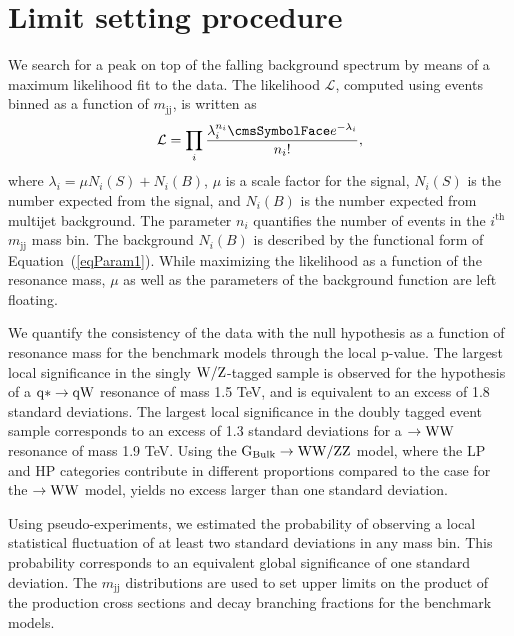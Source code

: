 \newpage
\section{Limit setting procedure}
\label{sec:statistics}



We search for a peak on top of the falling background spectrum by
means of a maximum likelihood fit to the data. The likelihood $\mathcal{L}$, computed using events binned as a function of $m_\mathrm{jj}$,
is written as
\begin{equation} \mathcal{L} = \prod_{i}
  \frac{\lambda_{i}^{n_{i}}\re^{-\lambda_{i}}}{n_{i}!},
\end{equation}
where ${\lambda_{i}} = {\mu}{N_{i}(S)} + {N_{i}(B)}$,
$\mu$ is a scale factor for the signal, $N_i(S)$ is the number
expected from the signal, and $N_i(B)$ is the number expected from
multijet background. The parameter $n_i$ quantifies the number of
events in the $i^\mathrm{th}$ $m_\mathrm{jj}$ mass bin.
The background $N_i(B)$ is described by the functional form of
Equation~(\ref{eqParam1}). While maximizing the likelihood as a function of
the resonance mass, $\mu$ as well as the parameters of the background
function are left floating.


We quantify the consistency of the data with the null hypothesis as a
function of resonance mass for the benchmark models through the local
p-value. The largest local significance in the singly
${\rm W}/{\rm Z}$-tagged sample is observed for the hypothesis of a ${\rm q*
\to q{\rm W}}$ resonance of mass 1.5 TeV, and is equivalent to an excess
of 1.8 standard deviations. The largest local significance in the
doubly tagged event sample corresponds to an excess of 1.3 standard
deviations for a  \GRS$\to{\rm W}{\rm W}$ resonance of mass 1.9 TeV. Using the
${\rm G_\mathrm{Bulk}\to{\rm W}{\rm W}/{\rm Z}{\rm Z}}$ model, where the LP and HP categories
contribute in different proportions compared to the case for the
\GRS$\to{\rm W}{\rm W}$ model, yields no excess larger than one standard
deviation. 

Using pseudo-experiments, we estimated the probability of observing a
local statistical fluctuation of at least two standard deviations in
any mass bin. This probability corresponds to an equivalent global
significance of one standard deviation.  The $m_\mathrm{jj}$ distributions
are used to set upper limits on the product of the production cross
sections and decay branching fractions for the benchmark models.